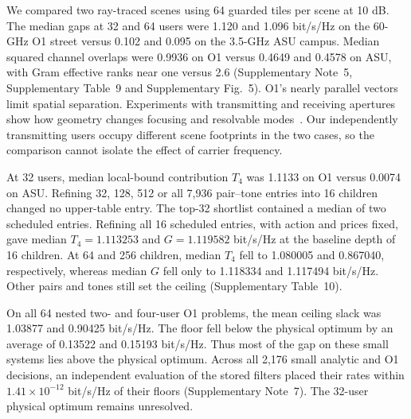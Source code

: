 We compared two ray-traced scenes using 64 guarded tiles per scene at 10 dB. The median gaps at 32 and 64 users were 1.120 and 1.096 bit/s/Hz on the 60-GHz O1 street versus 0.102 and 0.095 on the 3.5-GHz ASU campus. Median squared channel overlaps were 0.9936 on O1 versus 0.4649 and 0.4578 on ASU, with Gram effective ranks near one versus 2.6 (Supplementary Note~5, Supplementary Table~9 and Supplementary Fig.~5). O1's nearly parallel vectors limit spatial separation. Experiments with transmitting and receiving apertures show how geometry changes focusing and resolvable modes~\cite{kludze2026,shenoam2026}. Our independently transmitting users occupy different scene footprints in the two cases, so the comparison cannot isolate the effect of carrier frequency.

At 32 users, median local-bound contribution \(T_4\) was 1.1133 on O1 versus 0.0074 on ASU. Refining 32, 128, 512 or all 7,936 pair--tone entries into 16 children changed no upper-table entry. The top-32 shortlist contained a median of two scheduled entries. Refining all 16 scheduled entries, with action and prices fixed, gave median \(T_4=1.113253\) and \(G=1.119582\) bit/s/Hz at the baseline depth of 16 children. At 64 and 256 children, median \(T_4\) fell to 1.080005 and 0.867040, respectively, whereas median \(G\) fell only to 1.118334 and 1.117494 bit/s/Hz. Other pairs and tones still set the ceiling (Supplementary Table~10).

On all 64 nested two- and four-user O1 problems, the mean ceiling slack was 1.03877 and 0.90425 bit/s/Hz. The floor fell below the physical optimum by an average of 0.13522 and 0.15193 bit/s/Hz. Thus most of the gap on these small systems lies above the physical optimum. Across all 2,176 small analytic and O1 decisions, an independent evaluation of the stored filters placed their rates within \(1.41\times10^{-12}\) bit/s/Hz of their floors (Supplementary Note~7). The 32-user physical optimum remains unresolved.


